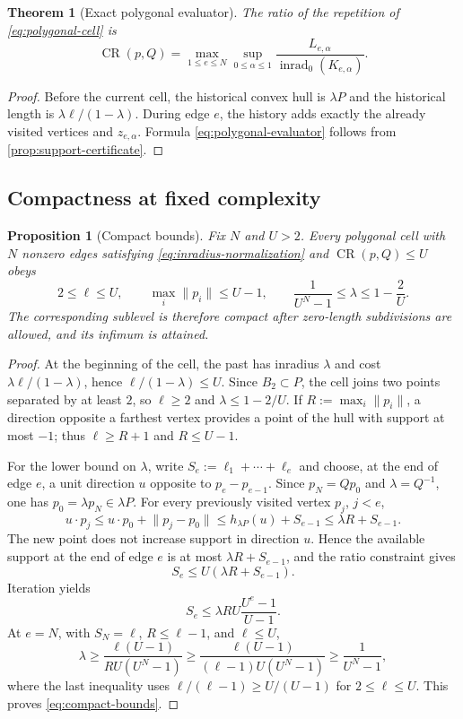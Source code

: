 \documentclass[10pt,a4paper]{article}
\newtheorem{theorem}{Theorem}[section]
\newtheorem{proposition}[proposition]{Proposition}
\theoremstyle{definition}
\theoremstyle{remark}
\DeclareMathOperator{\inrad}{inrad}
\DeclareMathOperator{\CR}{CR}
\newcommand{\norm}[1]{\lVert #1\rVert}
\begin{document}
\begin{theorem}[Exact polygonal evaluator]
\label{thm:polygonal-evaluator}
The ratio of the repetition of \eqref{eq:polygonal-cell} is
\begin{equation}
\CR(p,Q)=
\max_{1\le e\le N}\sup_{0\le\alpha\le1}
\frac{L_{e,\alpha}}{\inrad_0(K_{e,\alpha})}.
\label{eq:polygonal-evaluator}
\end{equation}
\end{theorem}

\begin{proof}
Before the current cell, the historical convex hull is $\lambda P$ and the historical length is $\lambda\ell/(1-\lambda)$. During edge $e$, the history adds exactly the already visited vertices and $z_{e,\alpha}$. Formula \eqref{eq:polygonal-evaluator} follows from \cref{prop:support-certificate}.
\end{proof}

\subsection{Compactness at fixed complexity}
\begin{proposition}[Compact bounds]
\label{prop:compact-bounds}
Fix $N$ and $U>2$. Every polygonal cell with $N$ nonzero edges satisfying \eqref{eq:inradius-normalization} and $\CR(p,Q)\le U$ obeys
\begin{equation}
2\le\ell\le U,
\qquad
\max_i\norm{p_i}\le U-1,
\qquad
\frac{1}{U^N-1}\le\lambda\le1-\frac{2}{U}.
\label{eq:compact-bounds}
\end{equation}
The corresponding sublevel is therefore compact after zero-length subdivisions are allowed, and its infimum is attained.
\end{proposition}

\begin{proof}
At the beginning of the cell, the past has inradius $\lambda$ and cost $\lambda\ell/(1-\lambda)$, hence $\ell/(1-\lambda)\le U$. Since $B_2\subset P$, the cell joins two points separated by at least $2$, so $\ell\ge2$ and $\lambda\le1-2/U$. If $R:=\max_i\norm{p_i}$, a direction opposite a farthest vertex provides a point of the hull with support at most $-1$; thus $\ell\ge R+1$ and $R\le U-1$.

For the lower bound on $\lambda$, write $S_e:=\ell_1+\cdots+\ell_e$ and choose, at the end of edge $e$, a unit direction $u$ opposite to $p_e-p_{e-1}$. Since $p_N=Qp_0$ and $\lambda=Q^{-1}$, one has $p_0=\lambda p_N\in\lambda P$. For every previously visited vertex $p_j$, $j<e$,
\[
u\cdot p_j\le u\cdot p_0+\norm{p_j-p_0}
\le h_{\lambda P}(u)+S_{e-1}
\le\lambda R+S_{e-1}.
\]
The new point does not increase support in direction $u$. Hence the available support at the end of edge $e$ is at most $\lambda R+S_{e-1}$, and the ratio constraint gives
\[
S_e\le U(\lambda R+S_{e-1}).
\]
Iteration yields
\[
S_e\le\lambda R U\frac{U^e-1}{U-1}.
\]
At $e=N$, with $S_N=\ell$, $R\le\ell-1$, and $\ell\le U$,
\[
\lambda\ge
\frac{\ell(U-1)}{RU(U^N-1)}
\ge
\frac{\ell(U-1)}{(\ell-1)U(U^N-1)}
\ge
\frac{1}{U^N-1},
\]
where the last inequality uses $\ell/(\ell-1)\ge U/(U-1)$ for $2\le\ell\le U$.
This proves \eqref{eq:compact-bounds}.
\end{proof}
\end{document}

